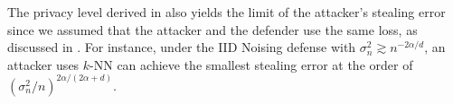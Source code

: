     The privacy level derived in  also yields the limit of the attacker's stealing error since we assumed that the attacker and the defender use the same loss, as discussed in . For instance, under the IID Noising defense with $\sigma_n^2 \gtrsim n^{-2\alpha/d}$, an attacker uses $k$-NN can achieve the smallest stealing error at the order of $(\sigma_n^2/n)^{2\alpha/(2\alpha+d)}$. 


    
   

            

